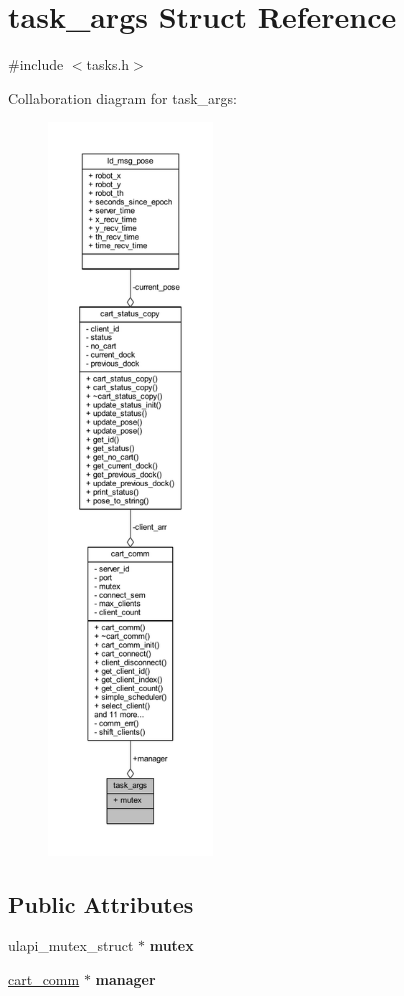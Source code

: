 \hypertarget{structtask__args}{}\section{task\+\_\+args Struct Reference}
\label{structtask__args}


{\ttfamily \#include $<$tasks.\+h$>$}



Collaboration diagram for task\+\_\+args\+:\nopagebreak
\begin{figure}[H]
\begin{center}
\leavevmode
\includegraphics[height=550pt]{structtask__args__coll__graph}
\end{center}
\end{figure}
\subsection*{Public Attributes}
\begin{DoxyCompactItemize}
\item 
\mbox{\label{structtask__args_ab88b631b1a6cd5554cdfb51f5718d277}} 
ulapi\+\_\+mutex\+\_\+struct $\ast$ {\bfseries mutex}
\item 
\mbox{\label{structtask__args_a5e09a1b2b448a92ddd08ad4bb785df50}} 
\mbox{\hyperlink{classcart__comm}{cart\+\_\+comm}} $\ast$ {\bfseries manager}
\end{DoxyCompactItemize}


